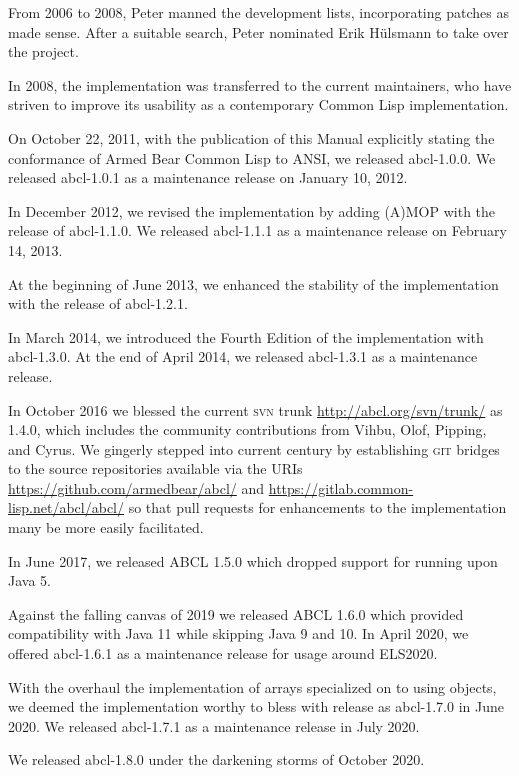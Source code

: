 \documentclass[10pt]{book}
\begin{document}
From 2006 to 2008, Peter manned the development lists, incorporating
patches as made sense.  After a suitable search, Peter nominated Erik
H\"{u}lsmann to take over the project.

In 2008, the implementation was transferred to the current
maintainers, who have striven to improve its usability as a
contemporary Common Lisp implementation.

On October 22, 2011, with the publication of this Manual explicitly
stating the conformance of Armed Bear Common Lisp to \textsc{ANSI}, we
released abcl-1.0.0.  We released abcl-1.0.1 as a maintenance release
on January 10, 2012.

In December 2012, we revised the implementation by adding
\textsc{(A)MOP} with the release of abcl-1.1.0.  We released
abcl-1.1.1 as a maintenance release on February 14, 2013.

At the beginning of June 2013, we enhanced the stability of the
implementation with the release of abcl-1.2.1.

In March 2014, we introduced the Fourth Edition of the implementation
with abcl-1.3.0.  At the end of April 2014, we released abcl-1.3.1 as
a maintenance release.

In October 2016 we blessed the current \textsc{svn} trunk
\url{http://abcl.org/svn/trunk/} as 1.4.0, which includes the
community contributions from Vihbu, Olof, Pipping, and Cyrus.  We
gingerly stepped into current century by establishing \textsc{git}
bridges to the source repositories available via the URIs
\url{https://github.com/armedbear/abcl/} and
\url{https://gitlab.common-lisp.net/abcl/abcl/} so that pull requests
for enhancements to the implementation many be more easily
facilitated.

In June 2017, we released ABCL 1.5.0 which dropped support for running
upon Java 5.

Against the falling canvas of 2019 we released ABCL 1.6.0 which
provided compatibility with Java 11 while skipping Java 9 and 10.  In
April 2020, we offered abcl-1.6.1 as a maintenance release for usage
around ELS2020.

With the overhaul the implementation of arrays specialized on
 to
using  objects, we deemed the implementation
worthy to bless with release as abcl-1.7.0 in June 2020.  We released
abcl-1.7.1 as a maintenance release in July 2020.

We released abcl-1.8.0 under the darkening storms of October 2020.
\end{document}
